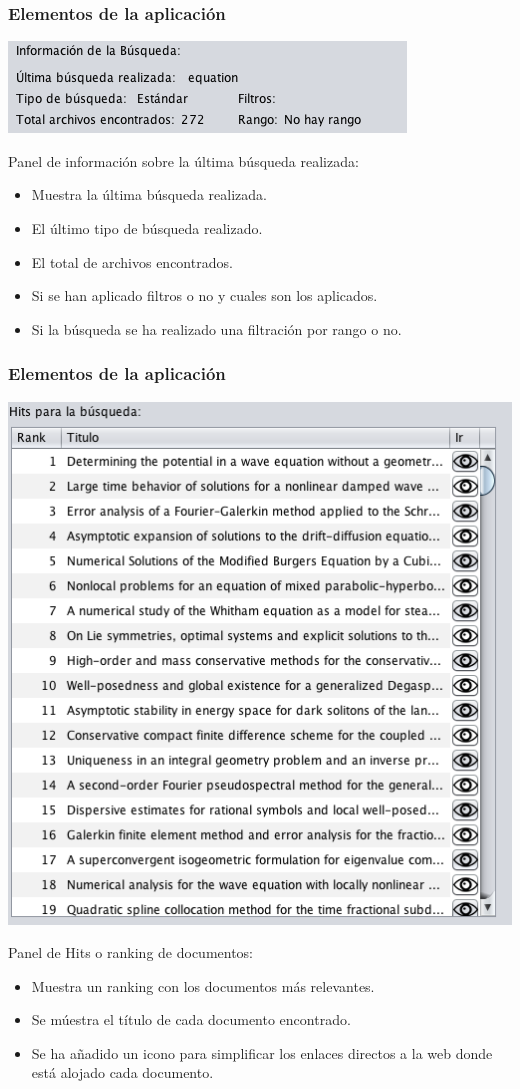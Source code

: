 \documentclass{beamer} %
\begin{document}
\begin{frame}
	\frametitle{Elementos de la aplicación}
	\begin{center}
		\includegraphics[scale=0.45]{Img/Img10.png}
	\end{center}
	Panel de información sobre la última búsqueda realizada:
	\begin{itemize}
		\item Muestra la última búsqueda realizada.
		\item El último tipo de búsqueda realizado.
		\item El total de archivos encontrados.
		\item Si se han aplicado filtros o no y cuales son los aplicados.
		\item Si la búsqueda se ha realizado una filtración por rango o no.
	\end{itemize}		
\end{frame}

\begin{frame}
	\frametitle{Elementos de la aplicación}
	\begin{center}
		\includegraphics[scale=0.2]{Img/Img11.png}
	\end{center}
	Panel de Hits o ranking de documentos:
	\begin{itemize}
		\item Muestra un ranking con los documentos más relevantes.
		\item Se múestra el título de cada documento encontrado.
		\item Se ha añadido un icono para simplificar los enlaces directos a la web donde está alojado cada documento.
	\end{itemize}	
\end{frame}
\end{document}
